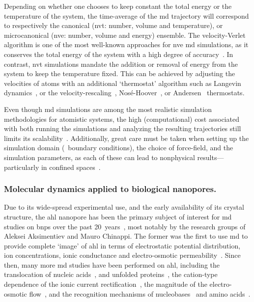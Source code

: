 Depending on whether one chooses to keep constant the total energy or the temperature of the system, the
time-average of the \gls{md} trajectory will correspond to respectively the canonical (\gls{nvt}: number,
volume and temperature), or microcanonical (\gls{nve}: number, volume and energy) ensemble. The
velocity-Verlet algorithm is one of the most well-known approaches for \gls{nve} \gls{md} simulations, as it
conserves the total energy of the system with a high degree of accuracy~\cite{Swope-1982}. In contrast,
\gls{nvt} simulations mandate the addition or removal of energy from the system to keep the temperature fixed.
This can be achieved by adjusting the velocities of atoms with an additional `thermostat' algorithm such as
Langevin dynamics~\cite{Bussi-2008}, or the velocity-rescaling~\cite{Heyes-1983},
Nos\'{e}-Hoover~\cite{Nose-1984,Hoover-1985}, or Andersen~\cite{Andersen-1980} thermostats.

Even though \gls{md} simulations are among the most realistic simulation methodologies for atomistic
systems, the high (computational) cost associated with both running the simulations and analyzing the
resulting trajectories still limits its scalability~\cite{Vendruscolo-2011,Phillips-2020}. Additionally, great
care must be taken when setting up the simulation domain (\ie~boundary conditions), the choice of force-field,
and the simulation parameters, as each of these can lead to nonphysical results---particularly in confined
spaces~\cite{Wong-ekkabut-2016a}.


\subsubsection{Molecular dynamics applied to biological nanopores.}
%

Due to its wide-spread experimental use, and the early availability of its crystal structure, the \gls{ahl}
nanopore has been the primary subject of interest for \gls{md} studies on \glspl{bnp} over the past
20~years~\cite{Aksimentiev-2005,DeBiase-2016,Basdevant-2019}, most notably by the research groups of Aleksei
Aksimentiev and Mauro Chinappi. The former was the first to use \gls{md} to provide complete `image' of
\gls{ahl} in terms of electrostatic potential distribution, ion concentrations, ionic conductance and
electro-osmotic permeability~\cite{Aksimentiev-2005}. Since then, many more \gls{md} studies have been
performed on \gls{ahl}, including the translocation of nucleic acids~\cite{Wells-2007}, and unfolded
proteins~\cite{DiMarino-2015}, the cation-type dependence of the ionic current
rectification~\cite{Bhattacharya-2011}, the magnitude of the electro-osmotic flow~\cite{Bonome-2017}, and the
recognition mechanisms of nucleobases~\cite{Manara-2015b,DeBiase-2016} and amino acids~\cite{DiMuccio-2019}.

